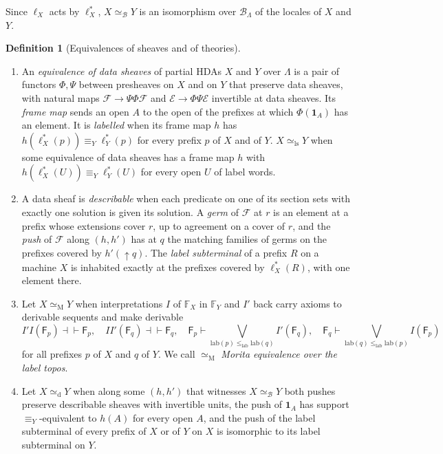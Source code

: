 \documentclass{lmcs}
\theoremstyle{definition}
\newtheorem{definition}[theorem]{Definition}
\theoremstyle{remark}
\newcommand{\Der}{\vdash}
\newcommand{\sbt}[1]{\mathbf{1}_{#1}}
\newcommand{\feq}[1]{\equiv_{#1}}
\newcommand{\upc}[1]{{\uparrow}#1}
\newcommand{\FX}[1]{\mathbb{F}_{#1}}
\newcommand{\fat}[1]{\mathsf{F}_{#1}}
\newcommand{\lab}{\mathrm{lab}}
\newcommand{\lle}{\leq_{\mathrm{lab}}}
\newcommand{\eqM}{\simeq_{\mathrm{M}}}
\newcommand{\eqD}{\simeq_{\mathrm{d}}}
\newcommand{\eqLs}{\simeq_{\mathrm{ls}}}
\providecommand{\lab}{\mathrm{lab}}
\providecommand{\BL}{\mathcal{B}_{\Lambda}}
\providecommand{\eqB}{\simeq_{\mathcal{B}}}
\providecommand{\lst}[1]{\ell^{*}_{#1}}
\begin{document}
Since $\ell_X$ acts by $\lst{X}$, $X\eqB Y$ is an isomorphism over $\BL$ of the locales of $X$ and $Y$.

\begin{definition}[Equivalences of sheaves and of theories]\label{def:streams}\label{def:setup-desc}
\begin{enumerate}
\item An \emph{equivalence of data sheaves} of partial HDAs $X$ and $Y$ over $\Lambda$ is a pair of functors $\Phi,\Psi$ between presheaves on $X$ and on $Y$
  that preserve data sheaves, with natural maps $\mathscr{F}\to\Psi\Phi\mathscr{F}$ and
  $\mathscr{E}\to\Phi\Psi\mathscr{E}$ invertible at data sheaves. Its \emph{frame map}
  sends an open $A$ to the open of the prefixes at which $\Phi(\sbt{A})$ has an element.
  It is \emph{labelled} when its frame map $h$ has $h(\lst{X}(p))\feq{Y}\lst{Y}(p)$ for every prefix $p$ of $X$ and
  of $Y$. $X\eqLs Y$ when some equivalence of data sheaves
  has a frame map $h$ with $h(\lst{X}(U))\feq{Y}\lst{Y}(U)$ for every open $U$ of label words.
\item A data sheaf is \emph{describable} when each predicate on one of its section sets with exactly one solution
  is given its solution. A \emph{germ} of $\mathscr{F}$ at
  $r$ is an element at a prefix whose extensions cover $r$, up to agreement on a cover of $r$, and the \emph{push} of
  $\mathscr{F}$ along $(h,h')$ has at $q$ the matching families of germs on the prefixes covered by
  $h'(\upc{q})$. The \emph{label subterminal}
  of a prefix $R$ on a machine $X$ is inhabited exactly at the prefixes covered by $\lst{X}(R)$, with one element
  there.
\item Let $X\eqM Y$ when interpretations $I$ of $\FX{X}$ in $\FX{Y}$ and $I'$ back carry axioms to derivable sequents
  and make derivable
  \[
    I'I(\fat{p})\dashv\vdash\fat{p},\quad II'(\fat{q})\dashv\vdash\fat{q},\quad
    \fat{p}\Der\textstyle\bigvee_{\lab(p)\lle\lab(q)}I'(\fat{q}),\quad
    \fat{q}\Der\textstyle\bigvee_{\lab(q)\lle\lab(p)}I(\fat{p})
  \]
  for all prefixes $p$ of $X$ and $q$ of $Y$. We call $\eqM$ \emph{Morita equivalence over
  the label topos}.
\item Let $X\eqD Y$ when along some $(h,h')$ that witnesses $X\eqB Y$ both pushes preserve describable sheaves with
  invertible units, the push of $\sbt{A}$ has support $\feq{Y}$-equivalent to $h(A)$ for every open $A$, and the
  push of the label subterminal of every prefix of $X$ or of $Y$ on $X$ is isomorphic to its label subterminal on
  $Y$.
\end{enumerate}
\end{definition}
\end{document}
